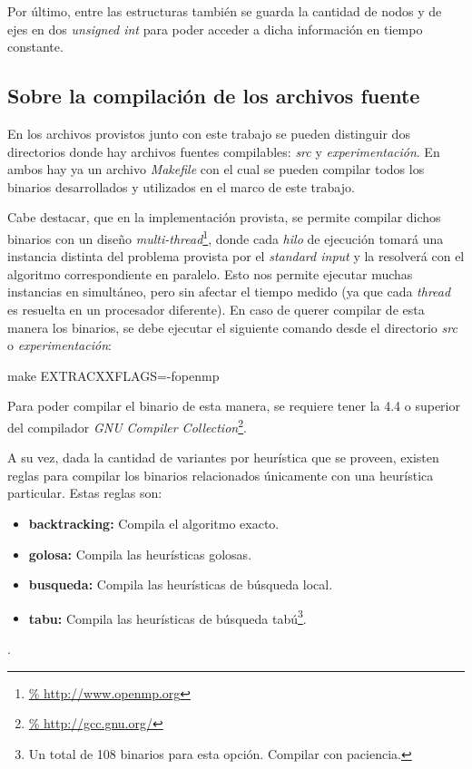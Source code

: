 \par Por \'ultimo, entre las estructuras tambi\'en se guarda la cantidad
    de nodos y de ejes en dos \emph{unsigned int} para poder acceder a dicha
    informaci\'on en tiempo constante.

{}
\subsection*{Sobre la compilaci\'on de los archivos fuente}
\par En los archivos provistos junto con este trabajo se pueden distinguir dos
    directorios donde hay archivos fuentes compilables: \emph{src} y
    \emph{experimentaci\'on}. En ambos hay ya un archivo \emph{Makefile} con el
    cual se pueden compilar todos los binarios desarrollados y utilizados en
    el marco de este trabajo.

\par Cabe destacar, que en la implementaci\'on provista, se permite compilar
    dichos binarios con un dise\~no \emph{multi-thread}\footnote{\url{%
    http://www.openmp.org}}, donde cada \emph{hilo} de ejecuci\'on tomar\'a
    una instancia distinta del problema provista por el \emph{standard input}
    y la resolver\'a con el algoritmo correspondiente en paralelo. Esto nos
    permite ejecutar muchas instancias en simult\'aneo, pero sin afectar
    el tiempo medido (ya que cada \emph{thread} es resuelta en un procesador
    diferente). En caso de querer compilar de esta manera los binarios, se
    debe ejecutar el siguiente comando desde el directorio \emph{src} o
    \emph{experimentaci\'on}:

\bigskip
\par make EXTRACXXFLAGS=-fopenmp
\bigskip

\par Para poder compilar el binario de esta manera, se requiere tener la 4.4
    o superior del compilador \emph{GNU Compiler Collection}\footnote{\url{%
    http://gcc.gnu.org/}}.

\bigskip
\par A su vez, dada la cantidad de variantes por heur\'istica que se
    proveen, existen reglas para compilar los binarios relacionados
    \'unicamente con una heur\'istica particular. Estas reglas son:

\begin{itemize}
    \item \textbf{backtracking: } Compila el algoritmo exacto.
    \item \textbf{golosa: } Compila las heur\'isticas golosas.
    \item \textbf{busqueda: } Compila las heur\'isticas de b\'usqueda local.
    \item \textbf{tabu: } Compila las heur\'isticas de b\'usqueda tab\'u\footnote{%
        Un total de 108 binarios para esta opci\'on. Compilar con paciencia.}.
\end{itemize}.

